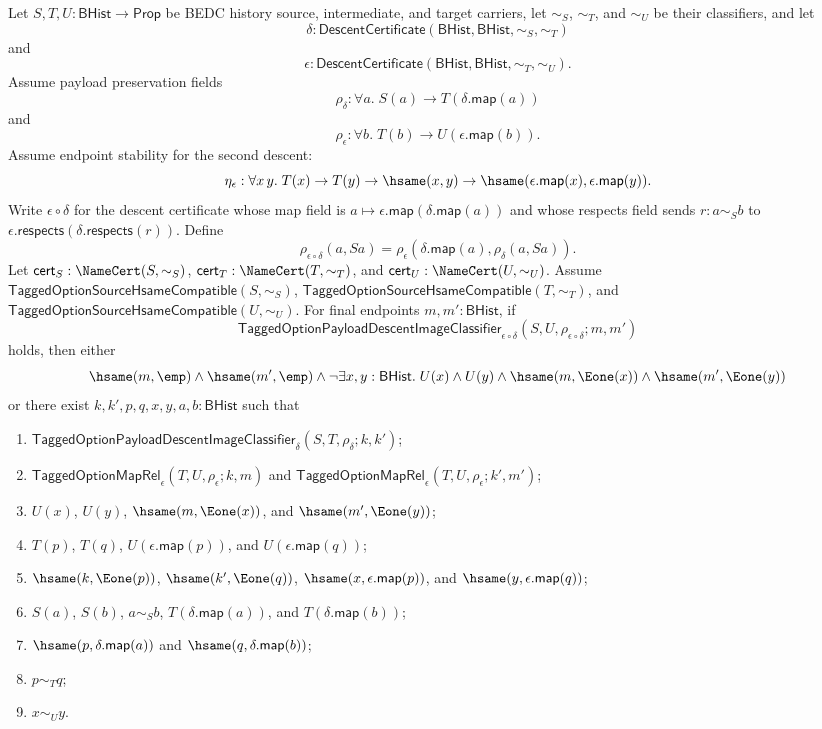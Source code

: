 \begin{theorem}
Let $S,T,U:\mathsf{BHist}\to\mathsf{Prop}$ be BEDC history source,
intermediate, and target carriers, let $\sim_S$, $\sim_T$, and $\sim_U$ be their
classifiers, and let
$$
\delta:\mathsf{DescentCertificate}(\mathsf{BHist},\mathsf{BHist},\sim_S,\sim_T)
$$
and
$$
\epsilon:\mathsf{DescentCertificate}(\mathsf{BHist},\mathsf{BHist},\sim_T,\sim_U).
$$
Assume payload preservation fields
$$
\rho_{\delta}:\forall a.\;S(a)\to T(\delta.\mathsf{map}(a))
$$
and
$$
\rho_{\epsilon}:\forall b.\;T(b)\to U(\epsilon.\mathsf{map}(b)).
$$
Assume endpoint stability for the second descent:
$$
\eta_{\epsilon}:\forall x\,y.\;
T(x)\to T(y)\to \hsame(x,y)\to
\hsame(\epsilon.\mathsf{map}(x),\epsilon.\mathsf{map}(y)).
$$
Write $\epsilon\circ\delta$ for the descent certificate whose map field is
$a\mapsto\epsilon.\mathsf{map}(\delta.\mathsf{map}(a))$ and whose respects field
sends $r:a\sim_S b$ to
$\epsilon.\mathsf{respects}(\delta.\mathsf{respects}(r))$. Define
$$
\rho_{\epsilon\circ\delta}(a,Sa)=
\rho_{\epsilon}(\delta.\mathsf{map}(a),\rho_{\delta}(a,Sa)).
$$
Let $\mathsf{cert}_S:\NameCert(S,\sim_S)$,
$\mathsf{cert}_T:\NameCert(T,\sim_T)$, and
$\mathsf{cert}_U:\NameCert(U,\sim_U)$. Assume
$\mathsf{TaggedOptionSourceHsameCompatible}(S,\sim_S)$,
$\mathsf{TaggedOptionSourceHsameCompatible}(T,\sim_T)$, and
$\mathsf{TaggedOptionSourceHsameCompatible}(U,\sim_U)$. For final endpoints
$m,m':\mathsf{BHist}$, if
$$
\mathsf{TaggedOptionPayloadDescentImageClassifier}_{\epsilon\circ\delta}
(S,U,\rho_{\epsilon\circ\delta};m,m')
$$
holds, then either
$$
\hsame(m,\emp)\land \hsame(m',\emp)\land
\neg\exists x,y:\mathsf{BHist}.\;
U(x)\land U(y)\land
\hsame(m,\Eone(x))\land
\hsame(m',\Eone(y))
$$
or there exist $k,k',p,q,x,y,a,b:\mathsf{BHist}$ such that
\begin{enumerate}
\item $\mathsf{TaggedOptionPayloadDescentImageClassifier}_{\delta}
(S,T,\rho_{\delta};k,k')$;
\item $\mathsf{TaggedOptionMapRel}_{\epsilon}(T,U,\rho_{\epsilon};k,m)$ and
$\mathsf{TaggedOptionMapRel}_{\epsilon}(T,U,\rho_{\epsilon};k',m')$;
\item $U(x)$, $U(y)$, $\hsame(m,\Eone(x))$, and
$\hsame(m',\Eone(y))$;
\item $T(p)$, $T(q)$, $U(\epsilon.\mathsf{map}(p))$, and
$U(\epsilon.\mathsf{map}(q))$;
\item $\hsame(k,\Eone(p))$, $\hsame(k',\Eone(q))$,
$\hsame(x,\epsilon.\mathsf{map}(p))$, and
$\hsame(y,\epsilon.\mathsf{map}(q))$;
\item $S(a)$, $S(b)$, $a\sim_S b$,
$T(\delta.\mathsf{map}(a))$, and $T(\delta.\mathsf{map}(b))$;
\item $\hsame(p,\delta.\mathsf{map}(a))$ and
$\hsame(q,\delta.\mathsf{map}(b))$;
\item $p\sim_T q$;
\item $x\sim_U y$.
\end{enumerate}
\end{theorem}
